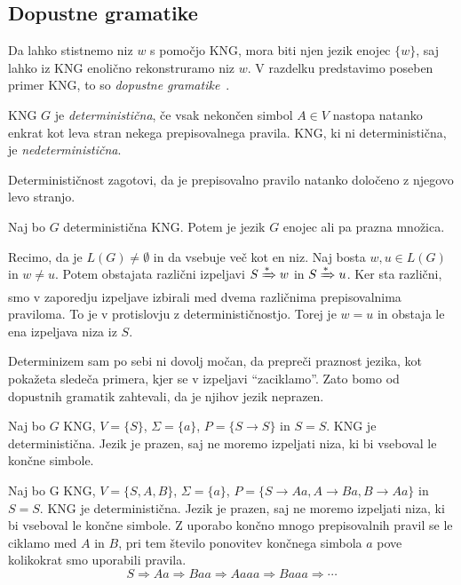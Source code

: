 \documentclass[fin1, tisk]{fmfdelo}
\theoremstyle{definition}
\begin{document}
\subsection{Dopustne gramatike}

Da lahko stistnemo niz $w$ s pomočjo KNG, mora biti njen jezik enojec $\{ w \}$, saj lahko
iz KNG enolično rekonstruramo niz $w$. V razdelku predstavimo poseben primer KNG, to so
\emph{dopustne gramatike}~\cite{KiefferYang2000}.

\begin{definicija}
    KNG $G$ je \emph{deterministična}, če vsak nekončen simbol $A \in V$ nastopa natanko enkrat
    kot leva stran nekega prepisovalnega pravila. KNG, ki ni deterministična, je 
    \emph{nedeterministična}.
\end{definicija}

Determinističnost zagotovi, da je prepisovalno pravilo natanko določeno z njegovo levo stranjo.

\begin{trditev}\label{trditev:DetJezik}
    Naj bo $G$ deterministična KNG. Potem je jezik $G$ enojec ali pa prazna množica.
\end{trditev}

\begin{dokaz}
    Recimo, da je $L(G) \neq \emptyset$ in da vsebuje več kot en niz. Naj bosta $w, u \in L(G)$
    in $w \neq u$. Potem obstajata različni izpeljavi $S \xRightarrow{*} w$ in 
    $S \xRightarrow{*} u$. Ker sta različni, smo v zaporedju izpeljave izbirali med dvema 
    različnima prepisovalnima praviloma. To je v protislovju z determinističnostjo. Torej je 
    $w = u$ in obstaja le ena izpeljava niza iz $S$.
\end{dokaz}

Determinizem sam po sebi ni dovolj močan, da prepreči praznost jezika, kot pokažeta sledeča
primera, kjer se v izpeljavi ``zaciklamo''. Zato bomo od dopustnih gramatik zahtevali, da je 
njihov jezik neprazen.

\begin{primer}
    Naj bo $G$ KNG, $V = \{ S \}$, $\Sigma = \{ a \}$, $P = \{ S \rightarrow S \}$ in $S = S$.
    KNG je deterministična. Jezik je prazen, saj ne moremo izpeljati niza, ki bi vseboval le
    končne simbole.
\end{primer}

\begin{primer}
    Naj bo G KNG, $V = \{ S, A, B \} $, $\Sigma = \{ a \}$, 
    $P = \{ S \rightarrow \mathit{Aa}, A \rightarrow \mathit{Ba}, B \rightarrow \mathit{Aa} \}$ in $S = S$. 
    KNG je deterministična. Jezik je prazen, saj ne moremo izpeljati niza, ki bi vseboval le 
    končne simbole. Z uporabo končno mnogo prepisovalnih pravil se le ciklamo med $A$ in $B$, 
    pri tem število ponovitev končnega simbola $a$ pove kolikokrat smo uporabili pravila.
    \[
        S \Rightarrow \mathit{Aa} \Rightarrow \mathit{Baa} \Rightarrow \mathit{Aaaa} \Rightarrow
        \mathit{Baaa} \Rightarrow \cdots
    \]
\end{primer}
\end{document}
